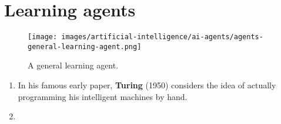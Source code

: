\section{Learning agents}

\begin{figure}[H]
    \centering
    \texttt{[image: images/artificial-intelligence/ai-agents/agents-general-learning-agent.png]}
    \caption*{A general learning agent. \cite{common/online/tools/draw.io}}
\end{figure}


\vspace{0.5cm}


\begin{enumerate}[itemsep=0.2cm]
    \item In his famous early paper, \textbf{Turing} (1950) considers the idea of actually programming his intelligent machines by hand.
    \hfill \cite{ai/book/Artificial-Intelligence-A-Modern-Approach/Russell-Norvig}

    \item 

\end{enumerate}


\vspace{0.5cm}




























